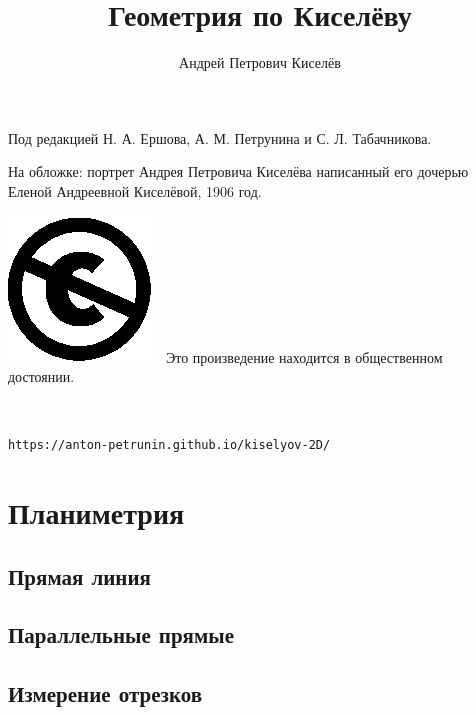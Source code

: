 \documentclass[twoside]{book}
\begin{document}
\cleardoublepage
\frontmatter
\title{Геометрия по Киселёву}
\author{Андрей Петрович Киселёв}
\date{}
\maketitle

\thispagestyle{empty}

Под редакцией Н. А. Ершова, А. М. Петрунина и С. Л. Табачникова.

На обложке: портрет  Андрея Петровича Киселёва написанный его дочерью Еленой Андреевной Киселёвой, 1906 год.

\vfill

\noindent
\includegraphics[scale=.25]{eps/Cc-public_domain_mark_white}\ \ 
Это произведение находится в общественном достоянии.

\ 

\noindent\texttt{https://anton-petrunin.github.io/kiselyov-2D/} 

\mainmatter




\part{Планиметрия}

\chapter{Прямая линия}





\chapter{Параллельные прямые}










\chapter{Измерение отрезков}


\end{document}
